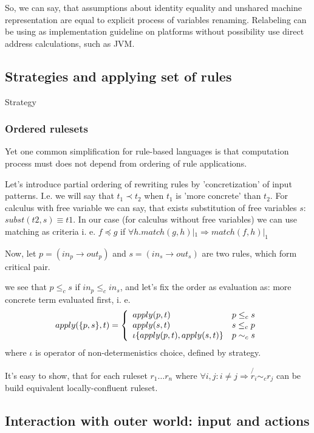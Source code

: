 \documentclass[10pt]{article}
\begin{document}
 So, we can say, that assumptions about identity equality and unshared machine representation 
are equal to explicit process of variables renaming. Relabeling can be using as implementation guideline on platforms without possibility use direct address calculations, such as JVM.

\subsection{Strategies and applying set of rules}

Strategy

  
\subsubsection{ Ordered rulesets }

Yet one common simplification for rule-based languages is that computation process must does not depend from ordering of rule applications.   

Let's introduce partial ordering of rewriting rules by 'concretization' of input patterns.  I.e. we will say that $t_1 {\prec} t_2$ when $t_1$ is 'more concrete' than $t_2$.  
For calculus with free variable we can say, that exists substitution of free variables $s$: $subst(t2,s) \equiv t1$.  In our case (for calculus without free variables) we can use matching as criteria i. e. $f \preceq g$ if  $\forall h. match(g,h)|_{1} \Rightarrow match(f,h)|_{1}$ 
 
 
   Now, let $p=(in_{p} \to out_{p})$ and $s=(in_{s} \to out_{s})$ are two rules, which form critical pair.
   
   
    we see that $p \le_{c} s$ if $in_{p} {\le}_{c} in_{s}$, and let's fix the order as evaluation as: more concrete term evaluated first, i. e.  
$$
 apply(\{p,s\},t)=\left\{
  \begin{array}{l l}
    apply(p,t) & p \le_{c} s \\
    apply(s,t) & s \le_{c} p \\
    \iota\{apply(p,t),apply(s,t)\} & p \sim_{c} s\\
  \end{array}
 \right.
$$
 where $\iota$ is operator of non-determenistics choice, defined by strategy.

It's easy to show, that for each ruleset ${r_{1}\dots r_{n}}$ where $\forall i,j : i\neq j \Rightarrow \not {r_i} \sim_{c} r_j$ can be build equivalent locally-confluent ruleset.


\subsection{Interaction with outer world: input and actions}
\end{document}

